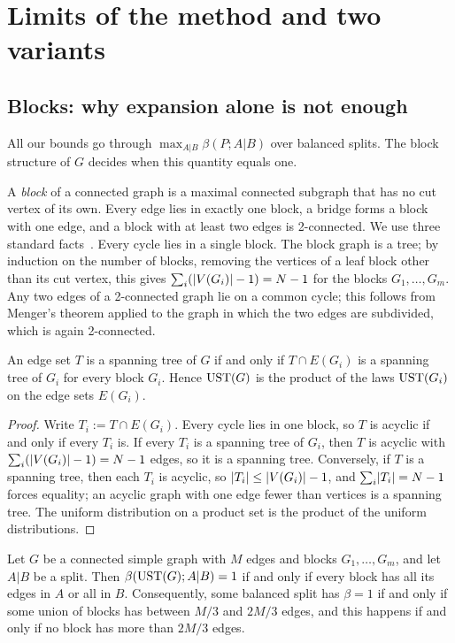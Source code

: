 \section{Limits of the method and two variants}\label{sec:limits}

\subsection{Blocks: why expansion alone is not enough}

All our bounds go through $\max_{A|B}\beta(P;A|B)$ over balanced splits. The block structure of $G$ decides when this quantity equals one.

A \emph{block} of a connected graph is a maximal connected subgraph that has no cut vertex of its own. Every edge lies in exactly one block, a bridge forms a block with one edge, and a block with at least two edges is 2-connected. We use three standard facts~\cite[Ch.~3]{Diestel17}. Every cycle lies in a single block. The block graph is a tree; by induction on the number of blocks, removing the vertices of a leaf block other than its cut vertex, this gives $\sum_i(\lvert V(G_i)\rvert-1)=N-1$ for the blocks $G_1,\dots,G_m$. Any two edges of a 2-connected graph lie on a common cycle; this follows from Menger's theorem applied to the graph in which the two edges are subdivided, which is again 2-connected.

\begin{lemma}\label{lem:blocks}
An edge set $T$ is a spanning tree of $G$ if and only if $T\cap E(G_i)$ is a spanning tree of $G_i$ for every block $G_i$. Hence $\mathrm{UST}(G)$ is the product of the laws $\mathrm{UST}(G_i)$ on the edge sets $E(G_i)$.
\end{lemma}

\begin{proof}
Write $T_i:=T\cap E(G_i)$. Every cycle lies in one block, so $T$ is acyclic if and only if every $T_i$ is. If every $T_i$ is a spanning tree of $G_i$, then $T$ is acyclic with $\sum_i(\lvert V(G_i)\rvert-1)=N-1$ edges, so it is a spanning tree. Conversely, if $T$ is a spanning tree, then each $T_i$ is acyclic, so $\lvert T_i\rvert\le\lvert V(G_i)\rvert-1$, and $\sum_i\lvert T_i\rvert=N-1$ forces equality; an acyclic graph with one edge fewer than vertices is a spanning tree. The uniform distribution on a product set is the product of the uniform distributions.
\end{proof}

\begin{proposition}\label{prop:blocks}
Let $G$ be a connected simple graph with $M$ edges and blocks $G_1,\dots,G_m$, and let $A|B$ be a split. Then $\beta(\mathrm{UST}(G);A|B)=1$ if and only if every block has all its edges in $A$ or all in $B$. Consequently, some balanced split has $\beta=1$ if and only if some union of blocks has between $M/3$ and $2M/3$ edges, and this happens if and only if no block has more than $2M/3$ edges.
\end{proposition}

